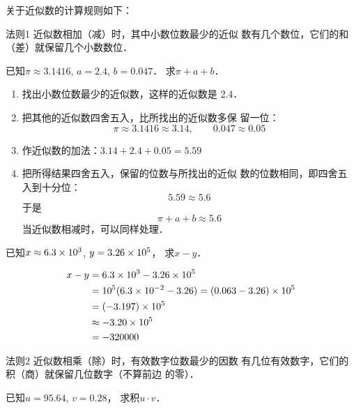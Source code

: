 关于近似数的计算规则如下：
\begin{blk}{法则1}
    近似数相加（减）时，其中小数位数最少的近似
    数有几个数位，它们的和（差）就保留几个小数数位．  
\end{blk}

\begin{example}
    已知$\pi\approx 3.1416$, $a=2.4$, $b=0.047$．
求$\pi+a+b$．
\end{example}    

\begin{solution}
\begin{enumerate}
\item 找出小数位数最少的近似数，这样的近似数是
    2.4．
    \item 把其他的近似数四舍五入，比所找出的近似数多保
    留一位：
    \[\pi\approx 3.1416\approx 3.14,\qquad 0.047\approx 0.05\]
    \item 作近似数的加法：$3.14+2.4+0.05=5.59$
    \item 把所得结果四舍五入，保留的位数与所找出的近似
    数的位数相同，即四舍五入到十分位：
    \[5.59\approx 5.6\]
    于是
    \[\pi+a+b\approx 5.6\]
    当近似数相减时，可以同样处理．
\end{enumerate}
\end{solution}

\begin{example}
已知$x\approx 6.3\times10^3$, $y=3.26\times10^5$，
求$x-y$．
\end{example}
    
    
\begin{solution}
\[\begin{split}
     x-y&=6.3\times10^3-3.26\times10^5\\
&=10^5(6.3\times10^{-2}-3.26)=(0.063-3.26)\times10^5\\
&=(-3.197)\times10^5\\
&\approx -3.20\times 10^5\\
&=-320000
\end{split}\]   
\end{solution}

\begin{blk}{法则2}
近似数相乘（除）时，有效数字位数最少的因数
有几位有效数字，它们的积（商）就保留几位数字（不算前边
的零）．
\end{blk}


\begin{example}
    已知$u=95.64$, $v=0.28$，
求积$u\cdot v$．
\end{example}


